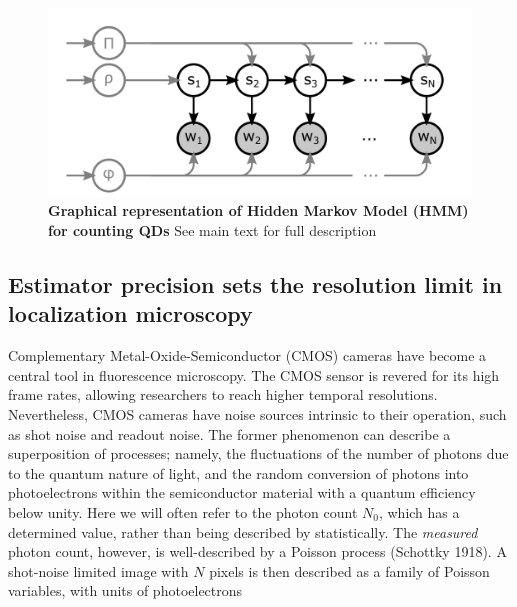 \documentclass{ucetd}
\begin{document}
\begin{figure}
\begin{center}
\includegraphics[width=16cm]{HMM.png}
\end{center}
\caption{\textbf{Graphical representation of Hidden Markov Model (HMM) for counting QDs} See main text for full description}
\end{figure}



\subsection{Estimator precision sets the resolution limit in localization microscopy}

Complementary Metal-Oxide-Semiconductor (CMOS) cameras have become a central tool in fluorescence microscopy. The CMOS sensor is revered for its high frame rates, allowing researchers to reach higher temporal resolutions. Nevertheless, CMOS cameras have noise sources intrinsic to their operation, such as shot noise and readout noise. The former phenomenon can describe a superposition of processes; namely, the fluctuations of the number of photons due to the quantum nature of light, and the random conversion of photons into photoelectrons within the semiconductor material with a quantum efficiency below unity. Here we will often refer to the photon count $N_{0}$, which has a determined value, rather than being described by statistically. The \emph{measured} photon count, however, is well-described by a Poisson process (Schottky 1918). A shot-noise limited image with $N$ pixels is then described as a family of Poisson variables, with units of photoelectrons
\end{document}
